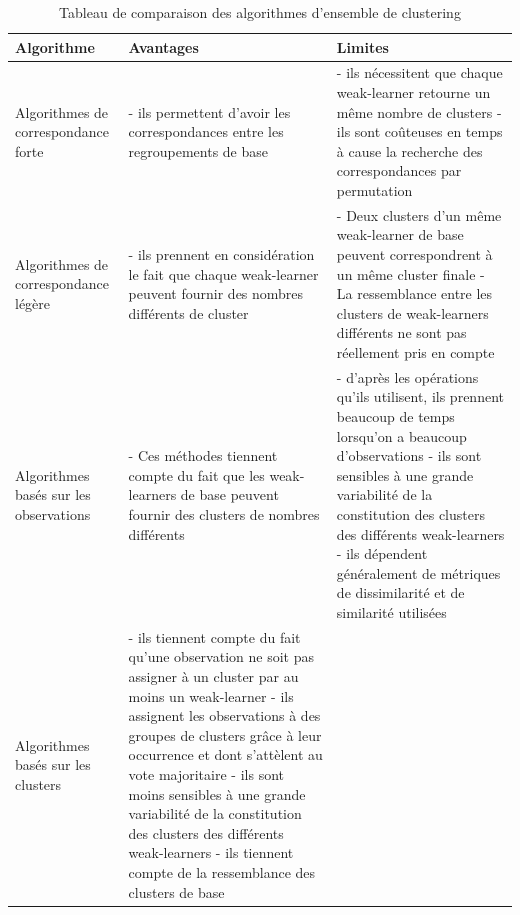   	  {\begin{longtable}{|p{4.5cm}|p{6cm}|p{6cm}|}
  		  \caption{Tableau de comparaison des algorithmes d'ensemble de clustering}
  		  \label{tab:comp_ens}
  			  \hline
 				   \textbf{Algorithme} & \textbf{Avantages} & \textbf{Limites} \\
  			  \hline
     				   Algorithmes de correspondance forte
     				   &
     				   {- ils permettent d'avoir les correspondances entre les regroupements de base}
     				   &
          			  {- ils nécessitent que chaque weak-learner retourne un même nombre de clusters} \newline\newline
     				   {- ils sont coûteuses en temps à cause la recherche des correspondances par permutation}
     				   \\
  			  \hline
     				   Algorithmes de correspondance légère
     				   &
     				   {- ils prennent en considération le fait que chaque weak-learner peuvent fournir des nombres différents de cluster}
     				   &
     				   {- Deux clusters d'un même weak-learner de base peuvent correspondrent à un même cluster finale} \newline\newline
          			  {- La ressemblance entre les clusters de weak-learners différents ne sont pas réellement pris en compte}
          			  {}
     				   \\
  			  \hline
     				   Algorithmes basés sur les observations
     				   &
     				   {- Ces méthodes tiennent compte du fait que les weak-learners de base peuvent fournir des clusters de nombres différents} \newline\newline
     				   &
          			  {- d'après les opérations qu'ils utilisent, ils prennent beaucoup de temps lorsqu'on a beaucoup d'observations} \newline\newline
          			  {- ils sont sensibles à une grande variabilité de la constitution des clusters des différents weak-learners} \newline\newline
          			  {- ils dépendent généralement de métriques de dissimilarité et de similarité utilisées}
     				   \\
  			  \hline
     				   Algorithmes basés sur les clusters
     				   &
     				   {- ils tiennent compte du fait qu'une observation ne soit pas assigner à un cluster par au moins un weak-learner} \newline\newline
     				   {- ils assignent les observations à des groupes de clusters grâce à leur occurrence et dont s'attèlent au vote majoritaire} \newline\newline
          			  {- ils sont moins sensibles à une grande variabilité de la constitution des clusters des différents weak-learners} \newline\newline
          			  {- ils tiennent compte de la ressemblance des clusters de base}


\end{longtable}}
